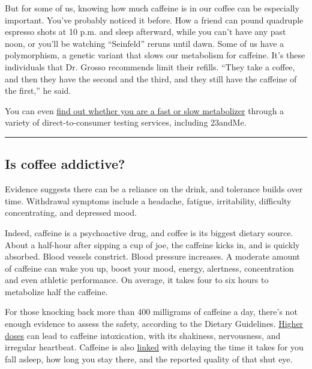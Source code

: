 But for some of us, knowing how much caffeine is in our coffee can be
especially important. You've probably noticed it before. How a friend
can pound quadruple espresso shots at 10 p.m. and sleep afterward, while
you can't have any past noon, or you'll be watching ``Seinfeld'' reruns
until dawn. Some of us have a polymorphism, a genetic variant that slows
our metabolism for caffeine. It's these individuals that Dr. Grosso
recommends limit their refills. ``They take a coffee, and then they have
the second and the third, and they still have the caffeine of the
first,'' he said.

You can even
\href{https://well.blogs.nytimes3xbfgragh.onion/2016/07/12/for-coffee-drinkers-the-buzz-may-be-in-your-genes/}{find
out whether you are a fast or slow metabolizer} through a variety of
direct-to-consumer testing services, including 23andMe.

\begin{center}\rule{0.5\linewidth}{\linethickness}\end{center}

\hypertarget{is-coffee-addictive}{%
\subsection{Is coffee addictive?}\label{is-coffee-addictive}}

Evidence suggests there can be a reliance on the drink, and tolerance
builds over time. Withdrawal symptoms include a headache, fatigue,
irritability, difficulty concentrating, and depressed mood.

Indeed, caffeine is a psychoactive drug, and coffee is its biggest
dietary source. About a half-hour after sipping a cup of joe, the
caffeine kicks in, and is quickly absorbed. Blood vessels constrict.
Blood pressure increases. A moderate amount of caffeine can wake you up,
boost your mood, energy, alertness, concentration and even athletic
performance. On average, it takes four to six hours to metabolize half
the caffeine.

For those knocking back more than 400 milligrams of caffeine a day,
there's not enough evidence to assess the safety, according to the
Dietary Guidelines.
\href{https://www.liebertpub.com/doi/10.1089/caff.2019.0020}{Higher
doses} can lead to caffeine intoxication, with its shakiness,
nervousness, and irregular heartbeat. Caffeine is also
\href{https://www.sciencedirect.com/science/article/abs/pii/S1087079216000150?via\%3Dihub}{linked}
with delaying the time it takes for you fall asleep, how long you stay
there, and the reported quality of that shut eye.

